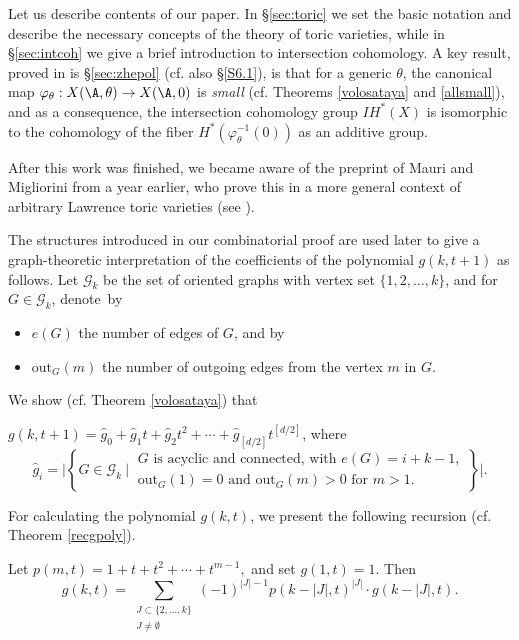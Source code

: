 Let us describe contents of our paper. In \S\ref{sec:toric} we set the basic 
notation and describe the necessary concepts of the theory of toric varieties, 
while in \S\ref{sec:intcoh} we give a  brief introduction to intersection 
cohomology.  A key result, proved in is \S\ref{sec:zhepol} (cf.  also 
\S\ref{S6.1}), is that for a generic $ 
\theta $, the canonical map $ \varphi_\theta:X(\A,\theta) \to X(\A,0)$ is \textit{small} 
(cf.  Theorems \ref{volosataya} and \ref{allsmall}), and as a consequence,
the intersection cohomology group $ IH^*(X) $ is isomorphic to the 
cohomology of the fiber $ H^*(\varphi_\theta^{-1}(0)) $ as an additive group.
\begin{rema}\label{remmm}
	After this work was finished, we became aware of the preprint \cite{MM} of 
Mauri and Migliorini from a year earlier, who prove this in a more general 
context of arbitrary Lawrence toric varieties (see \cite[Proposition 4.17]{MM}).
\end{rema}
The structures introduced in our combinatorial 
proof  are used later to give a graph-theoretic interpretation of the 
coefficients of the polynomial $g(k,t+1)$
as follows.  Let $ \mathcal{G}_{k} $ be the set of oriented graphs with vertex 
set 
$\{1, 2, \ldots, k\}$, and for $ G\in\mathcal{G}_{k} $,  denote~by \begin{itemize}
\item  $e(G) $ the number 
of edges of $ G $, and by 
\item $ \mathrm{out}_G(m) $ the number of outgoing edges from the vertex $ m $ in $ G $.
\end{itemize}
 We show (cf.  Theorem \ref{volosataya}) that 
 \begin{theorem} $g(k,t+1) = \hat{g}_0+ \hat{g}_1t+\hat{g}_2t^2+ \cdots +\hat{g}_{[d/2]} t^{[d/2]}$, where
\[
   \hat{g}_i = \bigg| \left\{ G\in\mathcal{G}_{k} \ \bigg\vert\
   \begin{array}{l}
    G \text{ is acyclic and connected, with } e(G)=i+k-1, \\
    \mathrm{out}_G(1)=0 \text{ and } \mathrm{out}_G(m)>0\text { for }m>1.
  \end{array}\right\} \bigg|.
\]
\end{theorem}
For calculating the polynomial $ g(k, t) $, we present the following recursion 
(cf.  Theorem \ref{recgpoly}).
\begin{theorem}
Let $p(m,t)=1+t+t^2+ \cdots +t^{m-1},$
and set $g(1,t)=1$. 
Then 
\begin{equation*}
g(k,t)= \sum_{\substack{J\subset\{2, \ldots ,k\} \\ J\neq\emptyset}}  (-1)^{|J|-1}p(k-|J|,t)^{|J|} \cdot g(k-|J|,t).
\end{equation*}
\end{theorem}



